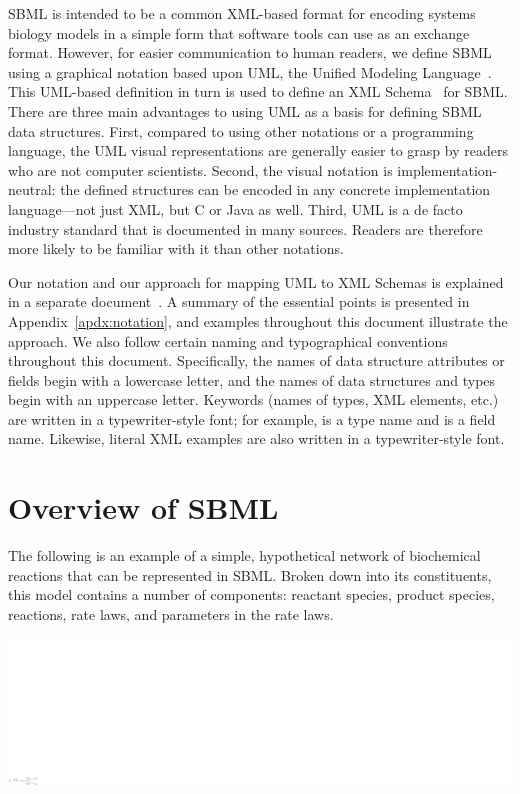 \documentclass[10pt]{cekarticle}
\newcommand{\changed}[1]{\textcolor{BrickRed}{#1}}
\begin{document}
SBML is intended to be a common XML-based format for encoding systems
biology models in a simple form that software tools can use as an exchange
format.  However, for easier communication to human readers, we define SBML
using a graphical notation based upon UML, the Unified Modeling
Language~\citep{eriksson:1998,oestereich:1999}.  This UML-based definition
in turn is used to define an XML
Schema~\citep{biron:2000,fallside:2000,thompson:2000} for SBML.  There are
three main advantages to using UML as a basis for defining SBML data
structures.  First, compared to using other notations or a programming
language, the UML visual representations are generally easier to grasp by
readers who are not computer scientists.  Second, the visual notation is
implementation-neutral: the defined structures can be encoded in any
concrete implementation language---not just XML, but C or Java as well.
Third, UML is a de facto industry standard that is documented in many
sources.  Readers are therefore more likely to be familiar with it than
other notations.

Our notation and our approach for mapping UML to XML Schemas is explained
in a separate document~\citep{hucka:2000b}.  A summary of the essential
points is presented in Appendix~\ref{apdx:notation}, and examples
throughout this document illustrate the approach.  We also follow certain
naming and typographical conventions throughout this document.
Specifically, the names of data structure attributes or fields begin with a
lowercase letter, and the names of data structures and types begin with an
uppercase letter.  Keywords (names of types, XML elements, etc.) are
written in a typewriter-style font; for example,  is a
type name and  is a field name.  Likewise, literal XML
examples are also written in a typewriter-style font.


\section{Overview of SBML}
\label{sec:overview}

\changed{The following is an example of a simple, hypothetical network of
  biochemical reactions that can be represented in SBML.}  Broken down into
its constituents, this model contains a number of components: reactant
species, product species, reactions, rate laws, and parameters in the rate
laws.
\begin{center}
\includegraphics[scale = 0.85]{example-network}
\end{center}
\end{document}
